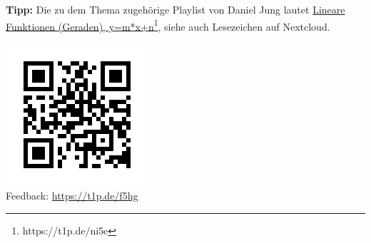 \documentclass[a4paper,ngerman,12pt]{exam}
\begin{document}

\par \textbf{Tipp:} Die zu dem Thema zugehörige Playlist von Daniel Jung lautet \href{https://t1p.de/ni5e}{Lineare Funktionen (Geraden), y=m*x+n\footnote{\url{https://t1p.de/ni5e}}}, siehe auch Lesezeichen auf Nextcloud.

\includegraphics[scale=0.4]{qr-code-t1p-de-f5hg.png}\\
Feedback: \href{https://t1p.de/f5hg}{https://t1p.de/f5hg}

%
\end{document}
